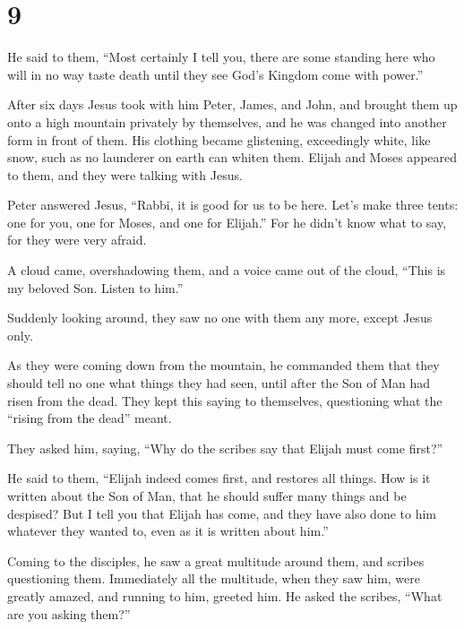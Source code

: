 \hypertarget{section-8}{%
\section{9}\label{section-8}}

 He said to them, ``Most certainly I tell you, there are
some standing here who will in no way taste death until they see God's
Kingdom come with power.''

 After six days Jesus took with him Peter, James, and
John, and brought them up onto a high mountain privately by themselves,
and he was changed into another form in front of them. 
His clothing became glistening, exceedingly white, like snow, such as no
launderer on earth can whiten them.  Elijah and Moses
appeared to them, and they were talking with Jesus.

 Peter answered Jesus, ``Rabbi, it is good for us to be
here. Let's make three tents: one for you, one for Moses, and one for
Elijah.''  For he didn't know what to say, for they were
very afraid.

 A cloud came, overshadowing them, and a voice came out of
the cloud, ``This is my beloved Son. Listen to him.''

 Suddenly looking around, they saw no one with them any
more, except Jesus only.

 As they were coming down from the mountain, he commanded
them that they should tell no one what things they had seen, until after
the Son of Man had risen from the dead.  They kept this
saying to themselves, questioning what the ``rising from the dead''
meant.

 They asked him, saying, ``Why do the scribes say that
Elijah must come first?''

 He said to them, ``Elijah indeed comes first, and
restores all things. How is it written about the Son of Man, that he
should suffer many things and be despised?  But I tell
you that Elijah has come, and they have also done to him whatever they
wanted to, even as it is written about him.''

 Coming to the disciples, he saw a great multitude around
them, and scribes questioning them.  Immediately all the
multitude, when they saw him, were greatly amazed, and running to him,
greeted him.  He asked the scribes, ``What are you asking
them?''

